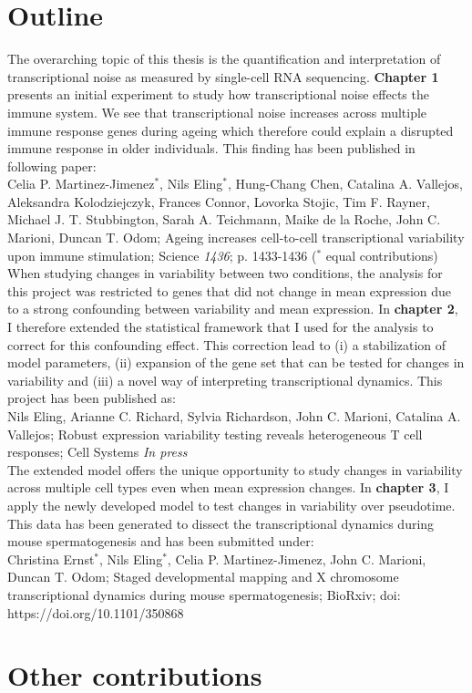 

\section{Outline}

The overarching topic of this thesis is the quantification and interpretation of transcriptional noise as measured by single-cell RNA sequencing. \textbf{Chapter 1} presents an initial experiment to study how  transcriptional noise effects the immune system. We see that transcriptional noise increases across multiple immune response genes during ageing which therefore could explain a disrupted immune response in older individuals. This finding has been published in following paper:\\

Celia P. Martinez-Jimenez$^\ast$, Nils  Eling$^\ast$, Hung-Chang Chen, Catalina A. Vallejos, Aleksandra Kolodziejczyk, Frances Connor, Lovorka Stojic, Tim F. Rayner, Michael J. T. Stubbington, Sarah A. Teichmann, Maike de la Roche, John C. Marioni, Duncan T. Odom; Ageing increases cell-to-cell transcriptional variability upon immune stimulation; Science \emph{1436}; p. 1433-1436 ($^\ast$ equal contributions) \\

When studying changes in variability between two conditions, the analysis for this project was restricted to genes that did not change in mean expression due to a strong confounding between variability and mean expression. In \textbf{chapter 2}, I therefore extended the statistical framework that I used for the analysis to correct for this confounding effect. This correction lead to (i) a stabilization of model parameters, (ii) expansion of the gene set that can be tested for changes in variability and (iii) a novel way of interpreting transcriptional dynamics. This project has been published as:\\

Nils Eling, Arianne C. Richard, Sylvia Richardson, John C. Marioni, Catalina A. Vallejos; Robust expression variability testing reveals heterogeneous T cell responses; Cell Systems \emph{In press} \\

The extended model offers the unique opportunity to study changes in variability across multiple cell types even when mean expression changes. In \textbf{chapter 3}, I apply the newly developed model to test changes in variability over pseudotime. This data has been generated to dissect the transcriptional dynamics during mouse spermatogenesis and has been submitted under: \\

Christina Ernst$^\ast$, Nils Eling$^\ast$, Celia P. Martinez-Jimenez, John C. Marioni, Duncan T. Odom; Staged developmental mapping and X chromosome transcriptional dynamics during mouse spermatogenesis; BioRxiv; doi: https://doi.org/10.1101/350868\\

\section{Other contributions}